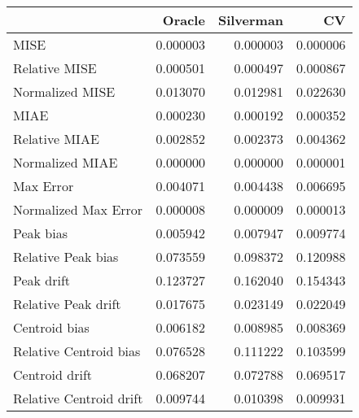 \begin{tabular}{lrrr}
  \hline
 & Oracle & Silverman & CV \\ 
  \hline
MISE & 0.000003 & 0.000003 & 0.000006 \\ 
  Relative MISE & 0.000501 & 0.000497 & 0.000867 \\ 
  Normalized MISE & 0.013070 & 0.012981 & 0.022630 \\ 
  MIAE & 0.000230 & 0.000192 & 0.000352 \\ 
  Relative MIAE & 0.002852 & 0.002373 & 0.004362 \\ 
  Normalized MIAE & 0.000000 & 0.000000 & 0.000001 \\ 
  Max Error & 0.004071 & 0.004438 & 0.006695 \\ 
  Normalized Max Error & 0.000008 & 0.000009 & 0.000013 \\ 
  Peak bias & 0.005942 & 0.007947 & 0.009774 \\ 
  Relative Peak bias & 0.073559 & 0.098372 & 0.120988 \\ 
  Peak drift & 0.123727 & 0.162040 & 0.154343 \\ 
  Relative Peak drift & 0.017675 & 0.023149 & 0.022049 \\ 
  Centroid bias & 0.006182 & 0.008985 & 0.008369 \\ 
  Relative Centroid bias & 0.076528 & 0.111222 & 0.103599 \\ 
  Centroid drift & 0.068207 & 0.072788 & 0.069517 \\ 
  Relative Centroid drift & 0.009744 & 0.010398 & 0.009931 \\ 
   \hline
\end{tabular}
